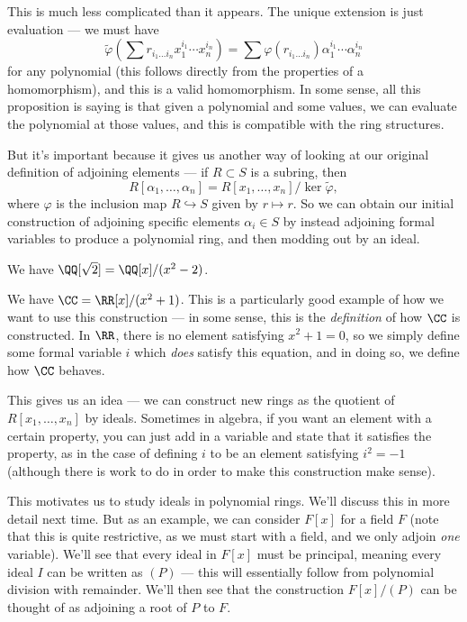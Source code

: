 This is much less complicated than it appears. The unique extension is just evaluation --- we must have \[\widetilde{\varphi}\left(\sum r_{i_1\ldots i_n}x_1^{i_1}\cdots x_n^{i_n}\right) = \sum \varphi(r_{i_1\ldots i_n})\alpha_1^{i_1}\cdots \alpha_n^{i_n}\] for any polynomial (this follows directly from the properties of a homomorphism), and this is a valid homomorphism. In some sense, all this proposition is saying is that given a polynomial and some values, we can evaluate the polynomial at those values, and this is compatible with the ring structures. 

But it's important because it gives us another way of looking at our original definition of adjoining elements --- if $R \subset S$ is a subring, then \[R[\alpha_1, \ldots, \alpha_n] = R[x_1, \ldots, x_n]/\ker \widetilde{\varphi},\] where $\varphi$ is the inclusion map $R \hookrightarrow S$ given by $r \mapsto r$. So we can obtain our initial construction of adjoining specific elements $\alpha_i \in S$ by instead adjoining formal variables to produce a polynomial ring, and then modding out by an ideal. 

\begin{example}
We have $\QQ[\sqrt{2}] = \QQ[x]/(x^2 - 2)$.
\end{example}

\begin{example}
We have $\CC = \RR[x]/(x^2 + 1)$. This is a particularly good example of how we want to use this construction --- in some sense, this is the \emph{definition} of how $\CC$ is constructed. In $\RR$, there is no element satisfying $x^2 + 1 = 0$, so we simply define some formal variable $i$ which \emph{does} satisfy this equation, and in doing so, we define how $\CC$ behaves.
\end{example}

This gives us an idea --- we can construct new rings as the quotient of $R[x_1, \ldots, x_n]$ by ideals. Sometimes in algebra, if you want an element with a certain property, you can just add in a variable and state that it satisfies the property, as in the case of defining $i$ to be an element satisfying $i^2 = -1$ (although there is work to do in order to make this construction make sense). 

This motivates us to study ideals in polynomial rings. We'll discuss this in more detail next time. But as an example, we can consider $F[x]$ for a field $F$ (note that this is quite restrictive, as we must start with a field, and we only adjoin \emph{one} variable). We'll see that every ideal in $F[x]$ must be principal, meaning every ideal $I$ can be written as $(P)$ --- this will essentially follow from polynomial division with remainder. We'll then see that the construction $F[x]/(P)$ can be thought of as adjoining a root of $P$ to $F$. 
